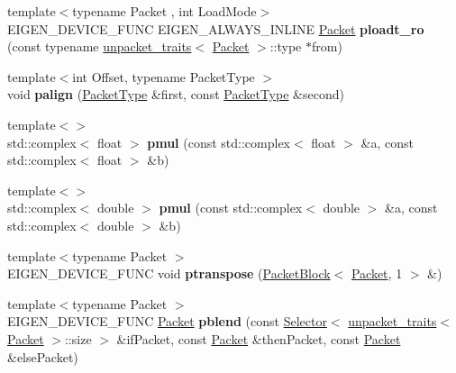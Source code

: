 \begin{DoxyCompactItemize}
{\footnotesize template$<$typename Packet , int Load\+Mode$>$ }\\E\+I\+G\+E\+N\+\_\+\+D\+E\+V\+I\+C\+E\+\_\+\+F\+U\+NC E\+I\+G\+E\+N\+\_\+\+A\+L\+W\+A\+Y\+S\+\_\+\+I\+N\+L\+I\+NE \hyperlink{union_eigen_1_1internal_1_1_packet}{Packet} {\bfseries ploadt\+\_\+ro} (const typename \hyperlink{struct_eigen_1_1internal_1_1unpacket__traits}{unpacket\+\_\+traits}$<$ \hyperlink{union_eigen_1_1internal_1_1_packet}{Packet} $>$\+::type $\ast$from)
\item 
\mbox{\label{namespace_eigen_1_1internal_a2ab4476e03df63e8154037294b2252c6}} 
{\footnotesize template$<$int Offset, typename Packet\+Type $>$ }\\void {\bfseries palign} (\hyperlink{struct_eigen_1_1_packet_type}{Packet\+Type} \&first, const \hyperlink{struct_eigen_1_1_packet_type}{Packet\+Type} \&second)
\item 
\mbox{\label{namespace_eigen_1_1internal_a0e31b9f7d8a0ef90b25fa709c3165fae}} 
{\footnotesize template$<$$>$ }\\std\+::complex$<$ float $>$ {\bfseries pmul} (const std\+::complex$<$ float $>$ \&a, const std\+::complex$<$ float $>$ \&b)
\item 
\mbox{\label{namespace_eigen_1_1internal_af59e2fabb53b7f974b73600f083c77ca}} 
{\footnotesize template$<$$>$ }\\std\+::complex$<$ double $>$ {\bfseries pmul} (const std\+::complex$<$ double $>$ \&a, const std\+::complex$<$ double $>$ \&b)
\item 
\mbox{\label{namespace_eigen_1_1internal_abafa3258d46f4f5b3311380649412131}} 
{\footnotesize template$<$typename Packet $>$ }\\E\+I\+G\+E\+N\+\_\+\+D\+E\+V\+I\+C\+E\+\_\+\+F\+U\+NC void {\bfseries ptranspose} (\hyperlink{struct_eigen_1_1internal_1_1_packet_block}{Packet\+Block}$<$ \hyperlink{union_eigen_1_1internal_1_1_packet}{Packet}, 1 $>$ \&)
\item 
\mbox{\label{namespace_eigen_1_1internal_a5512b53aba5494965a2d3ff675025294}} 
{\footnotesize template$<$typename Packet $>$ }\\E\+I\+G\+E\+N\+\_\+\+D\+E\+V\+I\+C\+E\+\_\+\+F\+U\+NC \hyperlink{union_eigen_1_1internal_1_1_packet}{Packet} {\bfseries pblend} (const \hyperlink{struct_eigen_1_1internal_1_1_selector}{Selector}$<$ \hyperlink{struct_eigen_1_1internal_1_1unpacket__traits}{unpacket\+\_\+traits}$<$ \hyperlink{union_eigen_1_1internal_1_1_packet}{Packet} $>$\+::size $>$ \&if\+Packet, const \hyperlink{union_eigen_1_1internal_1_1_packet}{Packet} \&then\+Packet, const \hyperlink{union_eigen_1_1internal_1_1_packet}{Packet} \&else\+Packet)

\end{DoxyCompactItemize}
